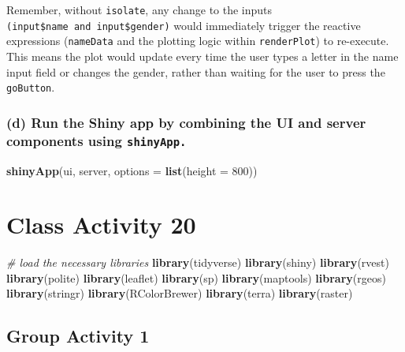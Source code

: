 \documentclass[
]{book}
\newenvironment{Shaded}{\begin{snugshade}}{\end{snugshade}}
\newcommand{\AttributeTok}[1]{\textcolor[rgb]{0.13,0.29,0.53}{#1}}
\newcommand{\CommentTok}[1]{\textcolor[rgb]{0.56,0.35,0.01}{\textit{#1}}}
\newcommand{\DecValTok}[1]{\textcolor[rgb]{0.00,0.00,0.81}{#1}}
\newcommand{\FunctionTok}[1]{\textcolor[rgb]{0.13,0.29,0.53}{\textbf{#1}}}
\newcommand{\NormalTok}[1]{#1}
\begin{document}
Remember, without \texttt{isolate}, any change to the inputs \texttt{(input\$name\ and\ input\$gender)} would immediately trigger the reactive expressions (\texttt{nameData} and the plotting logic within \texttt{renderPlot}) to re-execute. This means the plot would update every time the user types a letter in the name input field or changes the gender, rather than waiting for the user to press the \texttt{goButton}.

\hypertarget{d-run-the-shiny-app-by-combining-the-ui-and-server-components-using-shinyapp.}{%
\subsection{\texorpdfstring{(d) Run the Shiny app by combining the UI and server components using \texttt{shinyApp.}}{(d) Run the Shiny app by combining the UI and server components using shinyApp.}}\label{d-run-the-shiny-app-by-combining-the-ui-and-server-components-using-shinyapp.}}

\begin{Shaded}
\begin{Highlighting}[]
\FunctionTok{shinyApp}\NormalTok{(ui, server, }\AttributeTok{options =} \FunctionTok{list}\NormalTok{(}\AttributeTok{height =} \DecValTok{800}\NormalTok{))}
\end{Highlighting}
\end{Shaded}

\hypertarget{class-activity-20}{%
\chapter{Class Activity 20}\label{class-activity-20}}

\begin{Shaded}
\begin{Highlighting}[]
\CommentTok{\# load the necessary libraries}
\FunctionTok{library}\NormalTok{(tidyverse)}
\FunctionTok{library}\NormalTok{(shiny)}
\FunctionTok{library}\NormalTok{(rvest)}
\FunctionTok{library}\NormalTok{(polite)}
\FunctionTok{library}\NormalTok{(leaflet)}
\FunctionTok{library}\NormalTok{(sp)}
\FunctionTok{library}\NormalTok{(maptools)}
\FunctionTok{library}\NormalTok{(rgeos)}
\FunctionTok{library}\NormalTok{(stringr)}
\FunctionTok{library}\NormalTok{(RColorBrewer)}
\FunctionTok{library}\NormalTok{(terra)}
\FunctionTok{library}\NormalTok{(raster)}
\end{Highlighting}
\end{Shaded}

\hypertarget{group-activity-1-5}{%
\section{Group Activity 1}\label{group-activity-1-5}}
\end{document}

